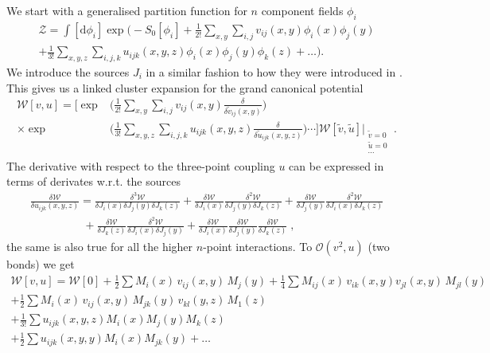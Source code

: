 We start with a generalised partition function for $n$ component fields $\phi_i$
%
\begin{multline} \label{eq:multi_point_scalar_Z}
  \mathcal{Z} = \int [\mathrm{d} \phi_i] \exp \bigg(-S_0[\phi_i]
  +\frac{1}{2!} \sum_{x,y} \sum_{i,j} v_{ij}(x,y) \phi_i(x) \phi_j(y) \\
  +\frac{1}{3!} \sum_{x,y,z} \sum_{i,j,k} u_{ijk}(x,y,z) \phi_i(x) \phi_j(y)
  \phi_k(z) + \dots \bigg).
\end{multline}
%
We introduce the sources $J_i$ in a similar fashion to how they were introduced
in . This gives us a linked cluster expansion for
the grand canonical potential
%
\begin{align}
  \mathcal{W}[v,u] = \bigg[ \exp&\bigg( \frac{1}{2!} \sum_{x,y} \sum_{i,j} v_{ij}(x,y) 
    \frac{\delta}{\delta \tilde{v}_{ij}(x,y)} \bigg)  \nonumber \\
  \times\exp&\bigg( \frac{1}{3!} \sum_{x,y,z} \sum_{i,j,k} u_{ijk}(x,y,z)
    \frac{\delta}{\delta \tilde{u}_{ijk}(x,y,z)} \bigg) \cdots
    \bigg] \mathcal{W}[\tilde{v},\tilde{u}] \Bigg|_{\substack{\tilde{v}=0\\\tilde{u}=0\\\cdots}}\;.
\end{align}
%
The derivative with respect to the three-point coupling $u$ can be expressed in
terms of derivates w.r.t. the sources
%
\begin{multline}
  \frac{\delta \mathcal{W}}{\delta u_{ijk}(x,y,z)} = \frac{\delta^3 \mathcal{W}}{\delta J_i(x) \delta J_j(y) \delta J_k(z)}
    + \frac{\delta \mathcal{W}}{\delta J_i(x)} \frac{\delta^2 \mathcal{W}}{\delta J_j(y) \delta J_k(z)}
    + \frac{\delta \mathcal{W}}{\delta J_j(y)} \frac{\delta^2 \mathcal{W}}{\delta J_i(x) \delta J_k(z)} \\
  \hspace{2cm} + \frac{\delta \mathcal{W}}{\delta J_k(z)} \frac{\delta^2 \mathcal{W}}{\delta J_i(x) \delta J_j(y)}
    + \frac{\delta \mathcal{W}}{\delta J_i(x)} \frac{\delta \mathcal{W}}{\delta J_j(y)}
    \frac{\delta \mathcal{W}}{\delta J_k(z)}\;,
\end{multline}
%
the same is also true for all the higher $n$-point interactions. To
$\mathcal{O}(v^2, u)$ (two bonds) we get
%
{\allowdisplaybreaks%
\begin{multline} 
  \mathcal{W}[v,u] = \mathcal{W}[0] + \frac{1}{2} \sum M_i(x) \,v_{ij}(x,y)\, M_j(y)
  + \frac{1}{4} \sum M_{ij}(x) \,v_{ik}(x,y)v_{jl}(x,y)\, M_{jl}(y)\\
  + \frac{1}{2} \sum M_i(x) \,v_{ij}(x,y)\, M_{jk}(y) \,v_{kl}(y,z)\, M_1(z)\\
  + \frac{1}{3!} \sum u_{ijk}(x,y,z) M_i(x) M_j(y) M_k(z) \\
  + \frac{1}{2} \sum u_{ijk}(x,y,y) M_i(x) M_{jk}(y) + \dots
\end{multline}}%
